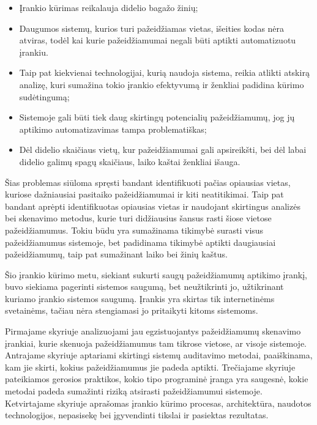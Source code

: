 \begin{itemize}
	\item Įrankio kūrimas reikalauja didelio bagažo žinių;
	\item Daugumos sistemų, kurios turi pažeidžiamas vietas, išeities kodas nėra atviras, todėl kai kurie pažeidžiamumai negali būti aptikti automatizuotu įrankiu. 
	\item Taip pat kiekvienai technologijai, kurią naudoja sistema, reikia atlikti atskirą analizę, kuri sumažina tokio įrankio efektyvumą ir ženkliai padidina kūrimo sudėtingumą;
	\item Sistemoje gali būti tiek daug skirtingų potencialių pažeidžiamumų, jog jų aptikimo automatizavimas tampa problematiškas;
	\item Dėl didelio skaičiaus vietų, kur pažeidžiamumai gali apsireikšti, bei dėl labai didelio galimų spagų skaičiaus, laiko kaštai ženkliai išauga.
\end{itemize}

Šias problemas siūloma spręsti bandant identifikuoti pačias opiausias vietas, kuriose dažniausiai pasitaiko pažeidžiamumai ir kiti neatitikimai. Taip pat bandant aprėpti identifikuotas opiausias vietas ir naudojant skirtingus analizės bei skenavimo metodus, kurie turi didžiausius šansus rasti šiose vietose pažeidžiamumus. Tokiu būdu yra sumažinama tikimybė surasti visus pažeidžiamumus sistemoje, bet padidinama tikimybė aptikti daugiausiai pažeidžiamumų, taip pat sumažinant laiko bei žinių kaštus. 

Šio įrankio kūrimo metu, siekiant sukurti saugų pažeidžiamumų aptikimo įrankį, buvo siekiama pagerinti sistemos saugumą, bet neužtikrinti jo, užtikrinant kuriamo įrankio sistemos saugumą. Įrankis yra skirtas tik internetinėms svetainėms, tačiau nėra stengiamasi jo pritaikyti kitoms sistemoms.

Pirmajame skyriuje analizuojami jau egzistuojantys pažeidžiamumų skenavimo įrankiai, kurie skenuoja pažeidžiamumus tam tikrose vietose, ar visoje sistemoje.
Antrajame skyriuje aptariami skirtingi sistemų auditavimo metodai, paaiškinama, kam jie skirti, kokius pažeidžiamumus jie padeda aptikti.
Trečiajame skyriuje pateikiamos gerosios praktikos, kokio tipo programinė įranga yra saugesnė, kokie metodai padeda sumažinti riziką atsirasti pažeidžiamumui sistemoje.
Ketvirtajame skyriuje aprašomas įrankio kūrimo procesas, architektūra, naudotos technologijos, nepasisekę bei įgyvendinti tikslai ir pasiektas rezultatas.